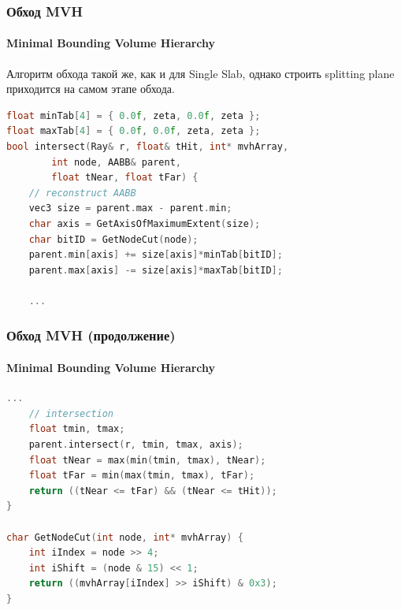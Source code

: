 \documentclass{beamer}
\begin{document}
\begin{frame}[fragile]
    \frametitle{Обход MVH}
    \framesubtitle{Minimal Bounding Volume Hierarchy}

    Алгоритм обхода такой же, как и для Single Slab, однако строить splitting plane приходится на самом этапе обхода.

    \begin{lstlisting}[language=C++,basicstyle=\ttfamily,keywordstyle=\color{blue}]
float minTab[4] = { 0.0f, zeta, 0.0f, zeta };
float maxTab[4] = { 0.0f, 0.0f, zeta, zeta };
bool intersect(Ray& r, float& tHit, int* mvhArray,
        int node, AABB& parent,
        float tNear, float tFar) {
    // reconstruct AABB
    vec3 size = parent.max - parent.min;
    char axis = GetAxisOfMaximumExtent(size);
    char bitID = GetNodeCut(node);
    parent.min[axis] += size[axis]*minTab[bitID];
    parent.max[axis] -= size[axis]*maxTab[bitID];

    ...
    \end{lstlisting}

\end{frame}

\begin{frame}[fragile]
    \frametitle{Обход MVH (продолжение)}
    \framesubtitle{Minimal Bounding Volume Hierarchy}

    \begin{lstlisting}[language=C++,basicstyle=\ttfamily,keywordstyle=\color{blue}]
    ...
    // intersection
    float tmin, tmax;
    parent.intersect(r, tmin, tmax, axis);
    float tNear = max(min(tmin, tmax), tNear);
    float tFar = min(max(tmin, tmax), tFar);
    return ((tNear <= tFar) && (tNear <= tHit));
}

char GetNodeCut(int node, int* mvhArray) {
    int iIndex = node >> 4;
    int iShift = (node & 15) << 1;
    return ((mvhArray[iIndex] >> iShift) & 0x3);
}
    \end{lstlisting}

\end{frame}
\end{document}
